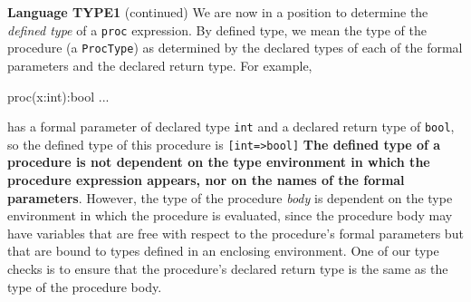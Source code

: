 \begin{minipage}[t]{\sw}
\slidenumber
\LARGE
{\bf Language TYPE1} (continued)\exx
We are now in a position to determine the {\em defined type}
of a \verb'proc' expression.
By defined type, we mean the type
of the procedure (a \verb'ProcType') as determined by the declared types
of each of the formal parameters and the declared return type.
For example,
\begin{qv}
proc(x:int):bool ...
\end{qv}
has a formal parameter of declared type \verb'int'
and a declared return type of \verb'bool',
so the defined type of this procedure is \verb'[int=>bool]'
{\bf The defined type of a procedure is not dependent on
the type environment in which the procedure expression appears,
nor on the names of the formal parameters}.\exx
However, the type of the procedure {\em body} is dependent on
the type environment in which the procedure is evaluated,
since the procedure body may have variables that are free
with respect to the procedure's formal parameters
but that are bound to types defined in an enclosing environment.
One of our type checks is to ensure
that the procedure's declared return type is the same
as the type of the procedure body.\exx
\end{minipage}
